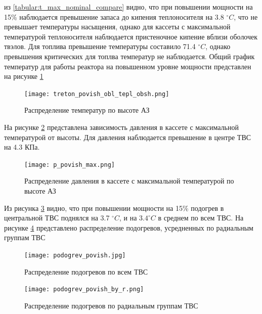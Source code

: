 из \ref{tabular:t_max_nominal_compare} видно, что при повышении мощности на 15\% наблюдается превышение запаса до кипения теплоносителя на 3.8 $^\circ C$, что не превышает температуры насыщения, однако для кассеты с максимальной температурой теплоносителя наблюдается пристеночное кипение вблизи оболочек твэлов. 
Для топлива превышение температуры составило 71.4 $^\circ C$, однако превышения критических для топлва температур не наблюдается. Общий график температур для работы реактора на повышенном уровне мощности представлен на рисунке \ref{pic:treton-povish-obl-tepl-obsh}

\begin{figure}[H]
	\begin{center}
		\texttt{[image: treton\_povish\_obl\_tepl\_obsh.png]}
		\caption{Распределение температур по высоте АЗ}
		\label{pic:treton-povish-obl-tepl-obsh} %
	\end{center}
\end{figure}


На рисунке \ref{pic:p-povish-max} представлена зависимость давления в кассете с максимальной температурой от высоты. Для давления наблюдается превышение в центре ТВС на 4.3 КПа. 


\begin{figure}[H]
	\begin{center}
		\texttt{[image: p\_povish\_max.png]}
		\caption{Распределение давления в кассете с максимальной температурой по высоте АЗ}
		\label{pic:p-povish-max} %
	\end{center}
\end{figure}

Из рисунка \ref{pic:podogrev-povish} видно, что при повышении мощности на 15\% подогрев в центральной ТВС поднялся на 3.7 $^\circ C$, и на $3.4 ^\circ C$ в среднем по всем ТВС. На рисунке \ref{pic:podogrev-povish-by-r} представлено распределение подогревов, усредненных по радиальным группам ТВС


\begin{figure}[H]
	\begin{center}
		\texttt{[image: podogrev\_povish.jpg]}
		\caption{Распределение подогревов по всем ТВС}
		\label{pic:podogrev-povish} %
	\end{center}
\end{figure}

\begin{figure}[H]
	\begin{center}
		\texttt{[image: podogrev\_povish\_by\_r.png]}
		\caption{Распределение подогревов по радиальным группам ТВС}
		\label{pic:podogrev-povish-by-r} %
	\end{center}
\end{figure}


